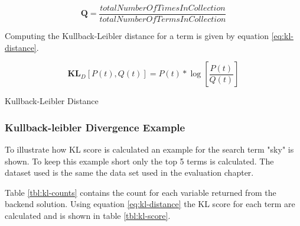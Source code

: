 \begin{cequation}[H]
	\begin{equation}
		\mathbf{Q} = \frac{totalNumberOfTimesInCollection}{totalNumberOfTermsInCollection}
	\end{equation}
	\caption{}
  \label{eq:kl-distribution-q}
\end{cequation}

Computing the Kullback-Leibler distance for a term is given by equation \ref{eq:kl-distance}.

\begin{cequation}[H]
	\begin{equation}
		\mathbf{KL}_D[P(t), Q(t)] = P(t)*\log{[\frac{P(t)}{Q(t)}]}
	\end{equation}
	\caption{Kullback-Leibler Distance}
  \label{eq:kl-distance}
\end{cequation}

\subsubsection{Kullback-leibler Divergence Example}
To illustrate how KL score is calculated an example for the search term "sky" is shown.
To keep this example short only the top 5 terms is calculated.
The dataset used is the same the data set used in the evaluation chapter.

Table \ref{tbl:kl-counts} contains the count for each variable returned from the backend solution.
Using equation \ref{eq:kl-distance} the KL score for each term are calculated and is shown in table \ref{tbl:kl-score}.

